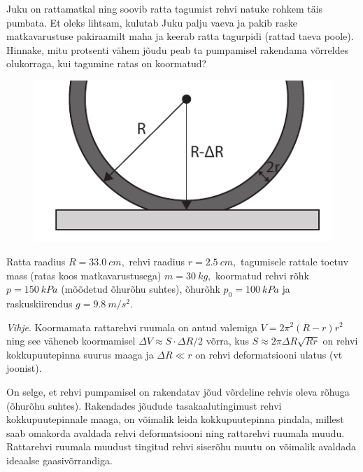 
Juku on rattamatkal ning soovib ratta tagumist rehvi natuke rohkem
täis pumbata. Et oleks lihtsam, kulutab Juku palju vaeva ja pakib
raske matkavarustuse pakiraamilt maha ja keerab ratta tagurpidi (rattad
taeva poole). Hinnake, mitu protsenti vähem jõudu peab ta pumpamisel
rakendama võrreldes olukorraga, kui tagumine ratas on koormatud?

\begin{figure}
	\vspace{-15pt}
	\includegraphics[width=\linewidth]{2017-lahg-05-fig_rattakumm.pdf}
\end{figure}

Ratta raadius $R=\SI{33.0}{cm},$ rehvi raadius $r=\SI{2.5}{cm},$
tagumisele rattale toetuv mass (ratas koos matkavarustusega) $m=\SI{30}{kg},$
koormatud rehvi rõhk $p=\SI{150}{kPa}$ (mõõdetud õhurõhu suhtes), õhurõhk $p_{0}=\SI{100}{kPa}$
ja raskuskiirendus $g=\SI{9.8}{m/s^{2}}.$ 

\textit{Vihje}. Koormamata rattarehvi ruumala on antud valemiga $V=2\pi^{2}\left(R-r\right)r^{2}$
ning see väheneb koormamisel $\Delta V\approx S\cdot\Delta R/2$ võrra,
kus $S\approx2\pi\Delta R\sqrt{Rr}$ on rehvi kokkupuutepinna suurus
maaga ja $\Delta R\ll r$ on rehvi deformatsiooni ulatus (vt joonist).

\hint
On selge, et rehvi pumpamisel on rakendatav jõud võrdeline rehvis oleva rõhuga (õhurõhu suhtes). Rakendades jõudude tasakaalutingimust rehvi kokkupuutepinnale maaga, on võimalik leida kokkupuutepinna pindala, millest saab omakorda avaldada rehvi deformatsiooni ning rattarehvi ruumala muudu. Rattarehvi ruumala muudust tingitud rehvi siserõhu muutu on võimalik avaldada ideaalse gaasivõrrandiga.

